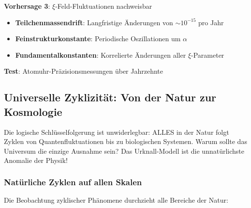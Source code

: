 \documentclass[12pt,a4paper]{article}
\theoremstyle{definition}
\begin{document}
	\begin{experiment}
		\textbf{Vorhersage 3}: $\xi$-Feld-Fluktuationen nachweisbar
		\begin{itemize}
			\item \textbf{Teilchenmassendrift}: Langfristige Änderungen von $\sim 10^{-15}$ pro Jahr
			\item \textbf{Feinstrukturkonstante}: Periodische Oszillationen um $\alpha$
			\item \textbf{Fundamentalkonstanten}: Korrelierte Änderungen aller $\xi$-Parameter
		\end{itemize}
		\textbf{Test}: Atomuhr-Präzisionsmessungen über Jahrzehnte
	\end{experiment}
	
	\subsection{Universelle Zyklizität: Von der Natur zur Kosmologie}
	
	\begin{revolutionary}
		Die logische Schlüsselfolgerung ist unwiderlegbar: ALLES in der Natur folgt Zyklen von Quantenfluktuationen bis zu biologischen Systemen. Warum sollte das Universum die einzige Ausnahme sein? Das Urknall-Modell ist die unnatürlichste Anomalie der Physik!
	\end{revolutionary}
	
	\subsubsection{Natürliche Zyklen auf allen Skalen}
	
	Die Beobachtung zyklischer Phänomene durchzieht alle Bereiche der Natur:
	
\end{document}

